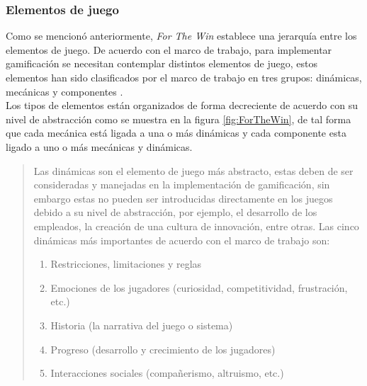 \subsubsection{Elementos de juego}

 \noindent Como se mencionó anteriormente, {\em For The Win} establece una jerarquía
 entre los elementos de juego. De acuerdo con el marco de trabajo, para implementar
 gamificación se necesitan contemplar distintos elementos de juego, estos elementos
 han sido clasificados por el marco de trabajo en tres grupos: dinámicas, mecánicas
 y componentes \cite[pp. 55-57]{ForTheWin}.\\

 \noindent Los tipos de elementos  están organizados de forma decreciente de acuerdo con su nivel
 de abstracción como se muestra en la figura \ref{fig:ForTheWin}, de tal forma que cada mecánica
 está ligada a una o más dinámicas y cada componente esta ligado a uno o más mecánicas y
 dinámicas.\\

 \begin{quote}
    Las dinámicas son el elemento de juego más abstracto, estas deben de ser
    consideradas y manejadas en la implementación de gamificación, sin embargo estas
    no pueden ser introducidas directamente en los juegos debido a su nivel de 
    abstracción, por ejemplo, el desarrollo de los empleados, la creación de una
    cultura de innovación, entre otras. Las cinco dinámicas más importantes de
    acuerdo con el marco de trabajo son:

    \begin{enumerate}
    \item Restricciones, limitaciones y reglas
    \item Emociones de los jugadores (curiosidad, competitividad, frustración, etc.)
    \item Historia (la narrativa del juego o sistema)
    \item Progreso (desarrollo y crecimiento de los jugadores)
    \item Interacciones sociales (compañerismo, altruismo, etc.)
    \end{enumerate}

 \end{quote}

 \clearpage

